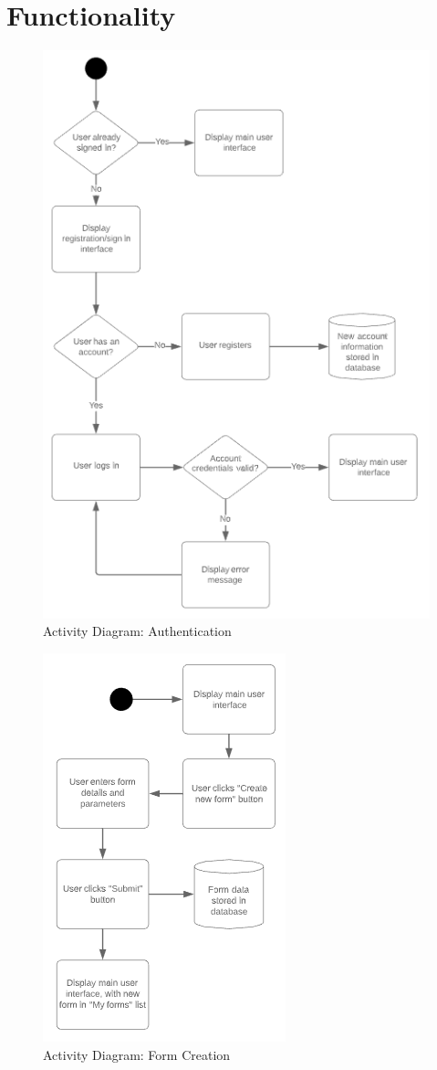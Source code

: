 \section{Functionality}

\begin{figure}[]
\center
\includegraphics{../figures/ActivityDiagramAuthentication}
\caption{Activity Diagram: Authentication}
\end{figure}

\begin{figure}[]
\center
\includegraphics{../figures/ActivityDiagramFormCreation}
\caption{Activity Diagram: Form Creation}
\end{figure}

